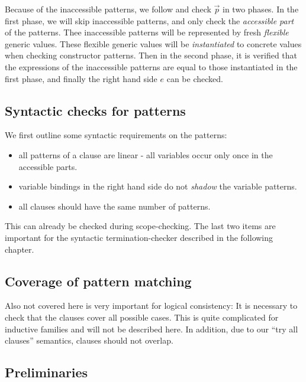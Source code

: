 Because of the inaccessible patterns, we follow \cite{norell:thesis} and check $\vec{p}$ in two phases.
In the first phase, we will skip inaccessible patterns, and only check the \emph{accessible part} of the patterns.
Thee inaccessible patterns will be represented by fresh \emph{flexible} generic values.
These flexible generic values will be \emph{instantiated} to concrete values when checking constructor patterns.
Then in the second phase, it is verified that the expressions of the inaccessible patterns are equal to those instantiated in the first phase, and finally the right hand side $e$ can be checked.

\newcommand{\subst}[2]{#1\{#2\}}
\newcommand{\substEnv}[2]{#1\{#2\}}
\newcommand{\compS}[2]{\opn{comp}\:#1\:#2}
\newcommand\ptv[2]{\Downarrow^{#1}#2}
\newcommand\ptvx{\opn{p2v}}
\newcommand\pstvs{\opn{p_{s}2v_{s}}}

\subsection{Syntactic checks for patterns}

We first outline some syntactic requirements on the patterns:
\begin{itemize}
\item
all patterns of a clause are linear - all variables occur only once in the accessible parts.
\item
variable bindings in the right hand side do not \emph{shadow} the variable patterns.
\item
all clauses should have the same number of patterns.
\end{itemize}
This can already be checked during scope-checking.
The last two items are important for the syntactic termination-checker described in the following chapter.

\subsection{Coverage of pattern matching}
Also not covered here is very important for logical consistency:
It is necessary to check that the clauses cover all possible cases.
This is quite complicated \cite{norell:thesis,schurmann03coverage} for inductive families and will not be described here.
In addition, due to our ``try all clauses'' semantics, clauses should not overlap.

\subsection{Preliminaries}


